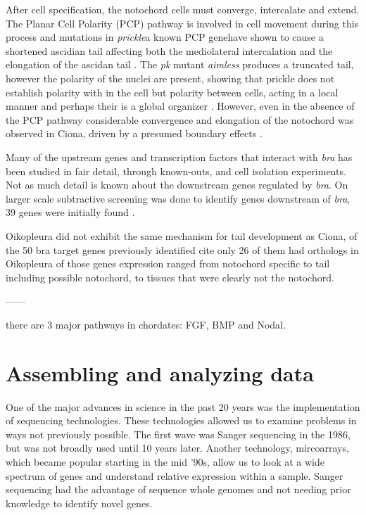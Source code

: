 After cell specification, the notochord cells must converge, intercalate and extend. The Planar Cell Polarity (PCP) pathway is involved in cell movement during this process and mutations in \textit{prickle}\textemdash a known PCP gene\textemdash have shown to cause a shortened ascidian tail affecting both the mediolateral intercalation and the elongation of the ascidan tail \cite{jiang_ascidian_2005}. The \textit{pk} mutant \textit{aimless} produces a truncated tail, however the polarity of the nuclei are present, showing that prickle does not establish polarity with in the cell but polarity between cells, acting in a local manner and perhaps their is a global organizer \cite{jiang_ascidian_2005,kourakis_one-dimensional_2014}. However, even in the absence of the PCP pathway considerable convergence and elongation of the notochord was observed in Ciona, driven by a presumed boundary effects \cite{veeman_chongmague_2008}.

Many of the upstream genes and transcription factors that interact with \textit{bra} has been studied in fair detail, through known-outs, and cell isolation experiments. Not as much detail is known about the downstream genes regulated by \textit{bra}. On larger scale subtractive screening was done to identify genes downstream of \textit{bra}, 39 genes were initially found \cite{hotta_temporal_1999}. 

Oikopleura did not exhibit the same mechanism for tail development as Ciona, of the 50 bra target genes previously identified cite only 26 of them had orthologs in Oikopleura \cite{kugler_evolutionary_2011} of those genes expression ranged from notochord specific to tail including possible notochord, to tissues that were clearly not the notochord.

------


there are 3 major pathways in chordates: FGF, BMP and Nodal.


\section{Assembling and analyzing data}
One of the major advances in science in the past 20 years was the implementation of sequencing technologies. These technologies allowed us to examine problems in ways not previously possible. The first wave was Sanger sequencing in the 1986, but was not broadly used until 10 years later. Another technology, mircoarrays, which became popular starting in the mid '90s, allow us to look at a wide spectrum of genes and understand relative expression within a sample. Sanger sequencing had the advantage of sequence whole genomes and not needing prior knowledge to identify novel genes.

